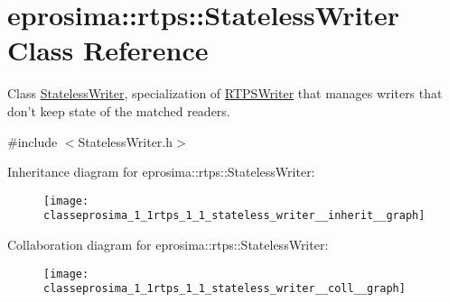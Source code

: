 \hypertarget{classeprosima_1_1rtps_1_1_stateless_writer}{\section{eprosima\-:\-:rtps\-:\-:\-Stateless\-Writer \-Class \-Reference}
\label{classeprosima_1_1rtps_1_1_stateless_writer}
}


\-Class \hyperlink{classeprosima_1_1rtps_1_1_stateless_writer}{\-Stateless\-Writer}, specialization of \hyperlink{classeprosima_1_1rtps_1_1_r_t_p_s_writer}{\-R\-T\-P\-S\-Writer} that manages writers that don't keep state of the matched readers.  




{\ttfamily \#include $<$\-Stateless\-Writer.\-h$>$}



\-Inheritance diagram for eprosima\-:\-:rtps\-:\-:\-Stateless\-Writer\-:\nopagebreak
\begin{figure}[H]
\begin{center}
\leavevmode
\texttt{[image: classeprosima\_1\_1rtps\_1\_1\_stateless\_writer\_\_inherit\_\_graph]}
\end{center}
\end{figure}


\-Collaboration diagram for eprosima\-:\-:rtps\-:\-:\-Stateless\-Writer\-:
\nopagebreak
\begin{figure}[H]
\begin{center}
\leavevmode
\texttt{[image: classeprosima\_1\_1rtps\_1\_1\_stateless\_writer\_\_coll\_\_graph]}
\end{center}
\end{figure}
